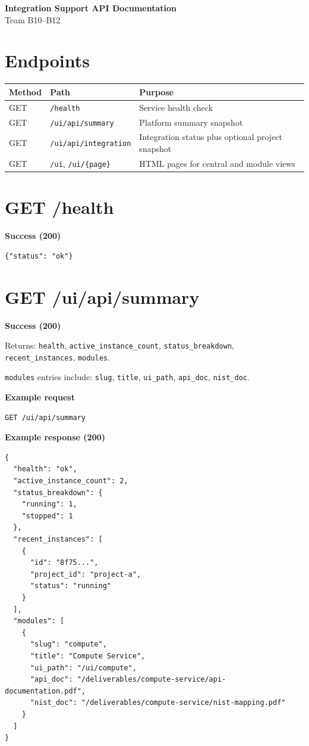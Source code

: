 \documentclass[11pt]{article}
\begin{document}
\begin{center}
    {\Large \textbf{Integration Support API Documentation}}\\
    Team B10--B12
\end{center}

\section*{Endpoints}

\begin{tabularx}{\textwidth}{>{\raggedright\arraybackslash}p{2.4cm} >{\raggedright\arraybackslash}p{4.6cm} X}
\toprule
Method & Path & Purpose \\
\midrule
GET & \texttt{/health} & Service health check \\
GET & \texttt{/ui/api/summary} & Platform summary snapshot \\
GET & \texttt{/ui/api/integration} & Integration status plus optional project snapshot \\
GET & \texttt{/ui}, \texttt{/ui/\{page\}} & HTML pages for central and module views \\
\bottomrule
\end{tabularx}

\section*{GET /health}

\textbf{Success (200)}
\begin{verbatim}
{"status": "ok"}
\end{verbatim}

\section*{GET /ui/api/summary}

\textbf{Success (200)}

Returns:
\texttt{health}, \texttt{active\_instance\_count}, \texttt{status\_breakdown}, \texttt{recent\_instances}, \texttt{modules}.

\texttt{modules} entries include:
\texttt{slug}, \texttt{title}, \texttt{ui\_path}, \texttt{api\_doc}, \texttt{nist\_doc}.

\textbf{Example request}
\begin{verbatim}
GET /ui/api/summary
\end{verbatim}

\textbf{Example response (200)}
\begin{verbatim}
{
  "health": "ok",
  "active_instance_count": 2,
  "status_breakdown": {
    "running": 1,
    "stopped": 1
  },
  "recent_instances": [
    {
      "id": "8f75...",
      "project_id": "project-a",
      "status": "running"
    }
  ],
  "modules": [
    {
      "slug": "compute",
      "title": "Compute Service",
      "ui_path": "/ui/compute",
      "api_doc": "/deliverables/compute-service/api-documentation.pdf",
      "nist_doc": "/deliverables/compute-service/nist-mapping.pdf"
    }
  ]
}
\end{verbatim}
\end{document}
